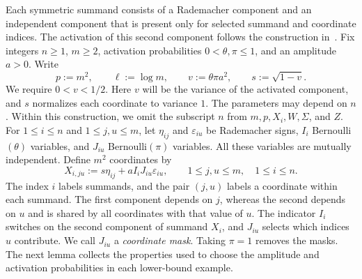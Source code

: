 \documentclass[11pt,letterpaper]{article}
\newenvironment{recovered}{}{}
\theoremstyle{remark}
\begin{document}
\begin{recovered}
Each symmetric summand consists of a Rademacher component and an
independent component that is present only for selected summand and
coordinate indices. The activation of this second component follows
the construction in~\cite[Proposition~E.1]{FKLZ}.
\end{recovered}
Fix integers \(n\ge1\), \(m\ge2\), activation probabilities
\(0<\theta,\pi\le1\), and an amplitude \(a>0\). Write
\[
 p:=m^2,\qquad \ell:=\log m,\qquad
 v:=\theta\pi a^2,\qquad s:=\sqrt{1-v}.
\]
We require \(0<v<1/2\). Here \(v\) will be the variance of the
activated component, and \(s\) normalizes each coordinate to variance
\(1\). The parameters may depend on \(n\). Within this construction,
we omit the subscript \(n\) from \(m,p,X_i,W,\Sigma\), and \(Z\).
\begin{recovered}
For \(1\le i\le n\) and \(1\le j,u\le m\), let \(\eta_{ij}\) and
\(\varepsilon_{iu}\) be Rademacher signs, \(I_i\) Bernoulli\((\theta)\)
variables, and \(J_{iu}\) Bernoulli\((\pi)\) variables. All these
variables are mutually independent.
\end{recovered} Define \(m^2\) coordinates by
\begin{equation}
 X_{i,ju}:=s\eta_{ij}+aI_iJ_{iu}\varepsilon_{iu},
 \qquad 1\le j,u\le m,\quad 1\le i\le n.
 \label{sym:eq:common-construction}
\end{equation}
\begin{recovered}
The index \(i\) labels summands, and the pair \((j,u)\) labels a
coordinate within each summand. The first component depends on \(j\),
whereas the second depends on \(u\) and is shared by all coordinates
with that value of \(u\). The indicator \(I_i\) switches on the second
component of summand \(X_i\), and \(J_{iu}\) selects which indices
\(u\) contribute. We call \(J_{iu}\) a \emph{coordinate mask}.
Taking \(\pi=1\) removes the masks.
\end{recovered}
\begin{recovered}
The next lemma collects the properties used to choose the amplitude
and activation probabilities in each lower-bound example.
\end{recovered}
\end{document}
